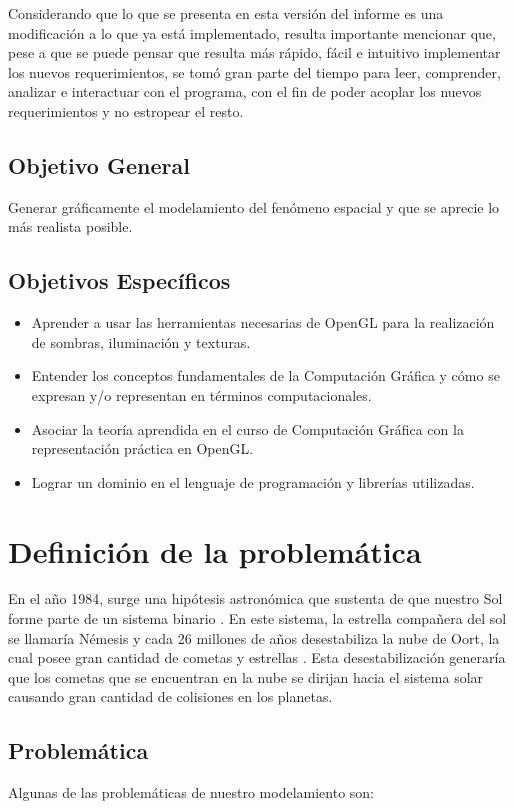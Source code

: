 \documentclass[journal]{IEEEtran}
\begin{document}
	Considerando que lo que se presenta en esta versión del informe es una modificación a lo que ya está implementado, resulta importante mencionar que, pese a que se puede pensar que resulta más rápido, fácil e intuitivo implementar los nuevos requerimientos, se tomó gran parte del tiempo para leer, comprender, analizar e interactuar con el programa, con el fin de poder acoplar los nuevos requerimientos y no estropear el resto.

\subsection{Objetivo General}
	Generar gráficamente el modelamiento del fenómeno espacial y que se aprecie lo más realista posible. 

\subsection{Objetivos Específicos}
	\begin{itemize}
		\item Aprender a usar las herramientas necesarias de OpenGL para la realización de sombras, iluminación 
		y texturas.
		\item Entender los conceptos fundamentales de la Computación Gráfica y cómo se expresan y/o representan 
		en términos computacionales.
		\item Asociar la teoría aprendida en el curso de Computación Gráfica con la 
		representación práctica en OpenGL.
		\item Lograr un dominio en el lenguaje  de programación y librerías utilizadas.	
	\end{itemize}
	
\section{Definición de la problemática}

En el año 1984, surge una hipótesis astronómica que sustenta de que nuestro Sol forme parte de un sistema binario \cite{RAMuller}. En este sistema, la estrella compañera del sol se llamaría Némesis y cada 26 millones de años desestabiliza la nube de Oort, la cual posee gran cantidad de cometas y estrellas \cite{astronomia}. Esta desestabilización generaría que los cometas que se encuentran en la nube se dirijan hacia el sistema solar causando gran cantidad de colisiones en los planetas.

\subsection{Problemática}
Algunas de las problemáticas de nuestro modelamiento son:\\
\end{document}
